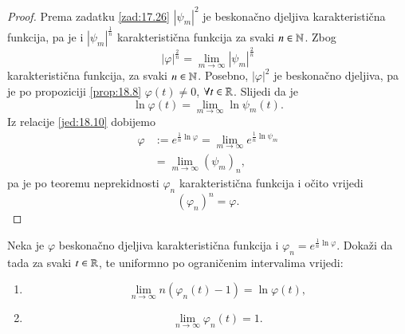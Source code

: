 \begin{proof}
    Prema zadatku \ref{zad:17.26} $|\psi_m|^2$ je beskona\v cno djeljiva karakteristi\v cna funkcija, pa je i $|\psi_m|^\frac{1}{n}$ karakteristi\v cna funkcija za svaki $n \in \mathbb{N}$.
    Zbog
    \begin{equation*}
        |\varphi|^\frac{2}{n} = \lim\limits_{m \to \infty} |\psi_m|^\frac{2}{n}
    \end{equation*}
    karakteristi\v cna funkcija, za svaki $n \in \mathbb{N}$.
    Posebno, $|\varphi|^2$ je beskona\v cno djeljiva, pa je po propoziciji \ref{prop:18.8} $\varphi (t) \neq 0$, $\forall t \in \mathbb{R}$.
    Slijedi da je
    \begin{equation*}
        \ln \varphi (t) = \lim\limits_{m \to \infty} \ln \psi_m (t).
    \end{equation*}
    Iz relacije \eqref{jed:18.10} dobijemo
    \begin{equation*}
        \begin{aligned}
            \varphi &:= e^{\frac{1}{n} \ln \varphi} = \lim\limits_{m \to \infty} e^{\frac{1}{n} \ln \psi_m}\\
            &= \lim_{m \to \infty} (\psi_m)_n,    %
        \end{aligned}
    \end{equation*}
    pa je po teoremu neprekidnosti $\varphi_n$ karakteristi\v cna funkcija i o\v cito vrijedi
    \begin{equation*}
        (\varphi_n)^n = \varphi.
    \end{equation*}
\end{proof}

\begin{zad} \label{zad:18.12}
    Neka je $\varphi$ beskona\v cno djeljiva karakteristi\v cna funkcija i $\varphi_n = e^{\frac{1}{n} \ln \varphi}$.
    Doka\v zi da tada za svaki $t \in \mathbb{R}$, te uniformno po ograni\v cenim intervalima vrijedi:
    \begin{enumerate}[label=(\alph*)]
        \item    \label{zad:18.12.1}
        \begin{equation*}
            \lim\limits_{n \to \infty} n (\varphi_n (t) - 1) = \ln \varphi (t),
        \end{equation*}
        \item   \label{zad:18.12.2}
        \begin{equation*}
            \lim\limits_{n \to \infty} \varphi_n (t) = 1.
        \end{equation*}
    \end{enumerate}
\end{zad}